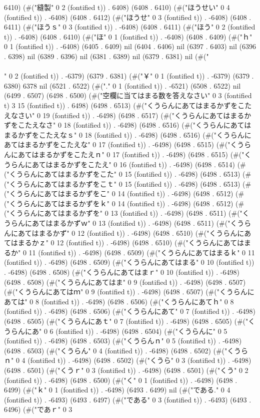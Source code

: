 6410) (#("縫製" 0 2 (fontified t)) . 6408) (6408 . 6410) (#("ほうせい" 0 4 (fontified t)) . -6408) (6408 . 6412) (#("ほうせ" 0 3 (fontified t)) . -6408) (6408 . 6411) (#("ほうｓ" 0 3 (fontified t)) . -6408) (6408 . 6411) (#("ほう" 0 2 (fontified t)) . -6408) (6408 . 6410) (#("ほ" 0 1 (fontified t)) . -6408) (6408 . 6409) (#("ｈ" 0 1 (fontified t)) . -6408) (6405 . 6409) nil (6404 . 6406) nil (6397 . 6403) nil (6396 . 6398) nil (6389 . 6396) nil (6381 . 6389) nil (6379 . 6381) nil (#("\\\\" 0 2 (fontified t)) . -6379) (6379 . 6381) (#("￥" 0 1 (fontified t)) . -6379) (6379 . 6380) 6378 nil (6521 . 6522) (#("." 0 1 (fontified t)) . -6521) (6508 . 6522) nil (6499 . 6507) (6498 . 6500) (#("空欄に当てはまる数を答えなさい" 0 3 (fontified t) 3 15 (fontified t)) . 6498) (6498 . 6513) (#("くうらんにあてはまるかずをこたえなさい" 0 19 (fontified t)) . -6498) (6498 . 6517) (#("くうらんにあてはまるかずをこたえなさ" 0 18 (fontified t)) . -6498) (6498 . 6516) (#("くうらんにあてはまるかずをこたえなｓ" 0 18 (fontified t)) . -6498) (6498 . 6516) (#("くうらんにあてはまるかずをこたえな" 0 17 (fontified t)) . -6498) (6498 . 6515) (#("くうらんにあてはまるかずをこたえｎ" 0 17 (fontified t)) . -6498) (6498 . 6515) (#("くうらんにあてはまるかずをこたえ" 0 16 (fontified t)) . -6498) (6498 . 6514) (#("くうらんにあてはまるかずをこた" 0 15 (fontified t)) . -6498) (6498 . 6513) (#("くうらんにあてはまるかずをこｔ" 0 15 (fontified t)) . -6498) (6498 . 6513) (#("くうらんにあてはまるかずをこ" 0 14 (fontified t)) . -6498) (6498 . 6512) (#("くうらんにあてはまるかずをｋ" 0 14 (fontified t)) . -6498) (6498 . 6512) (#("くうらんにあてはまるかずを" 0 13 (fontified t)) . -6498) (6498 . 6511) (#("くうらんにあてはまるかずｗ" 0 13 (fontified t)) . -6498) (6498 . 6511) (#("くうらんにあてはまるかず" 0 12 (fontified t)) . -6498) (6498 . 6510) (#("くうらんにあてはまるかｚ" 0 12 (fontified t)) . -6498) (6498 . 6510) (#("くうらんにあてはまるか" 0 11 (fontified t)) . -6498) (6498 . 6509) (#("くうらんにあてはまるｋ" 0 11 (fontified t)) . -6498) (6498 . 6509) (#("くうらんにあてはまる" 0 10 (fontified t)) . -6498) (6498 . 6508) (#("くうらんにあてはまｒ" 0 10 (fontified t)) . -6498) (6498 . 6508) (#("くうらんにあてはま" 0 9 (fontified t)) . -6498) (6498 . 6507) (#("くうらんにあてはｍ" 0 9 (fontified t)) . -6498) (6498 . 6507) (#("くうらんにあては" 0 8 (fontified t)) . -6498) (6498 . 6506) (#("くうらんにあてｈ" 0 8 (fontified t)) . -6498) (6498 . 6506) (#("くうらんにあて" 0 7 (fontified t)) . -6498) (6498 . 6505) (#("くうらんにあｔ" 0 7 (fontified t)) . -6498) (6498 . 6505) (#("くうらんにあ" 0 6 (fontified t)) . -6498) (6498 . 6504) (#("くうらんに" 0 5 (fontified t)) . -6498) (6498 . 6503) (#("くうらんｎ" 0 5 (fontified t)) . -6498) (6498 . 6503) (#("くうらん" 0 4 (fontified t)) . -6498) (6498 . 6502) (#("くうらｎ" 0 4 (fontified t)) . -6498) (6498 . 6502) (#("くうら" 0 3 (fontified t)) . -6498) (6498 . 6501) (#("くうｒ" 0 3 (fontified t)) . -6498) (6498 . 6501) (#("くう" 0 2 (fontified t)) . -6498) (6498 . 6500) (#("く" 0 1 (fontified t)) . -6498) (6498 . 6499) (#("ｋ" 0 1 (fontified t)) . -6498) (6493 . 6499) nil (#("である." 0 4 (fontified t)) . -6493) (6493 . 6497) (#("である" 0 3 (fontified t)) . -6493) (6493 . 6496) (#("であｒ" 0 3 